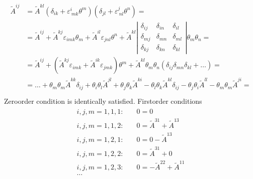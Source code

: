 \documentclass[letterpaper,10pt,english]{jupyterBook}
\begin{document}
\begin{equation*}
\begin{split}\begin{aligned}
  \widetilde{A}^{ij} 
  & = \widetilde{A}^{kl} ( \delta_{ik} + \varepsilon^i_{\ mk} \theta^m ) ( \delta_{jl} + \varepsilon^j_{\ nl} \theta^n ) = \\
  & = \widetilde{A}^{ij} + \widetilde{A}^{kj} \varepsilon_{imk} \theta_m + \widetilde{A}^{il} \varepsilon_{jnl} \theta^n +
  \widetilde{A}^{kl}
  \left| \begin{matrix} \delta_{ij} & \delta_{in} & \delta_{il} \\
                        \delta_{mj} & \delta_{mn} & \delta_{ml} \\
                        \delta_{kj} & \delta_{kn} & \delta_{kl} \end{matrix} \right| \theta_m \theta_n = \\
  & = \widetilde{A}^{ij} + \left( \widetilde{A}^{kj} \varepsilon_{imk} + \widetilde{A}^{ik} \varepsilon_{jmk} \right) \theta^m
    + \widetilde{A}^{kl} \theta_m \theta_n \left( \delta_{ij} \delta_{mn} \delta_{kl} + \dots \right) = \\
  & = \dots + \theta_m \theta_m \widetilde{A}^{kk} \delta_{ij} + \theta_i \theta_l \widetilde{A}^{jl} + \theta_j \theta_k \widetilde{A}^{ki} 
    - \theta_l \theta_k \widetilde{A}^{kl} \delta_{ij} - \theta_j \theta_i \widetilde{A}^{ll} - \theta_m \theta_m \widetilde{A}^{ji} = \\
\end{aligned}\end{split}
\end{equation*}
\sphinxAtStartPar
Zero\sphinxhyphen{}order condition is identically satisfied.
First\sphinxhyphen{}order conditions
\begin{equation*}
\begin{split}\begin{aligned}
  i,j, m = 1, 1, 1 :& \quad 0 = 0                                       \\
  i,j, m = 1, 1, 2 :& \quad 0 = \widetilde{A}^{31} + \widetilde{A}^{13} \\
  i,j, m = 1, 2, 1 :& \quad 0 = 0 - \widetilde{A}^{13} \\
  i,j, m = 1, 2, 2 :& \quad 0 = \widetilde{A}^{31} + 0 \\
  i,j, m = 1, 2, 3 :& \quad 0 = - \widetilde{A}^{22} + \widetilde{A}^{11} \\
  \dots
\end{aligned}\end{split}
\end{equation*}
\end{document}
